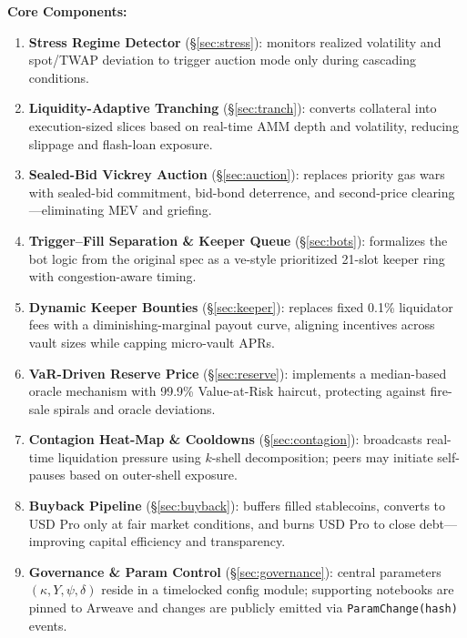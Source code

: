 \documentclass[11pt]{article}
\newcommand{\secref}[1]{\hyperref[#1]{\S\ref*{#1}}}
\begin{document}
\vspace{1em}
\noindent
\textbf{Core Components:}
\begin{enumerate}[label=\textbf{\arabic*.},wide, labelindent=0pt]
  \item \textbf{Stress Regime Detector} (\secref{sec:stress}): monitors realized volatility and spot/TWAP deviation to trigger auction mode only during cascading conditions.

  \item \textbf{Liquidity-Adaptive Tranching} (\secref{sec:tranch}): converts collateral into execution-sized slices based on real-time AMM depth and volatility, reducing slippage and flash-loan exposure.

  \item \textbf{Sealed-Bid Vickrey Auction} (\secref{sec:auction}): replaces priority gas wars with sealed-bid commitment, bid-bond deterrence, and second-price clearing—eliminating MEV and griefing.

  \item \textbf{Trigger–Fill Separation \& Keeper Queue} (\secref{sec:bots}): formalizes the bot logic from the original spec as a ve-style prioritized 21-slot keeper ring with congestion-aware timing.

  \item \textbf{Dynamic Keeper Bounties} (\secref{sec:keeper}): replaces fixed 0.1\% liquidator fees with a diminishing-marginal payout curve, aligning incentives across vault sizes while capping micro-vault APRs.

  \item \textbf{VaR-Driven Reserve Price} (\secref{sec:reserve}): implements a median-based oracle mechanism with 99.9\% Value-at-Risk haircut, protecting against fire-sale spirals and oracle deviations.

  \item \textbf{Contagion Heat-Map \& Cooldowns} (\secref{sec:contagion}): broadcasts real-time liquidation pressure using $k$-shell decomposition; peers may initiate self-pauses based on outer-shell exposure.

  \item \textbf{Buyback Pipeline} (\secref{sec:buyback}): buffers filled stablecoins, converts to USD Pro only at fair market conditions, and burns USD Pro to close debt—improving capital efficiency and transparency.

  \item \textbf{Governance \& Param Control} (\secref{sec:governance}): central parameters \((\kappa, Y, \psi, \delta)\) reside in a timelocked config module; supporting notebooks are pinned to Arweave and changes are publicly emitted via \texttt{ParamChange(hash)} events.
\end{enumerate}
\end{document}
